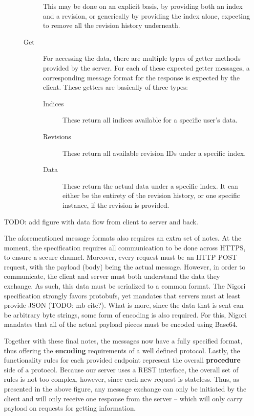 \begin{description}
\begin{description}
    This may be done on an explicit basis, by providing both an index and a revision, or generically by providing the index alone, expecting to remove all the revision history underneath.
    \item[Get] For accessing the data, there are multiple types of getter methods provided by the server.
    For each of these expected getter messages, a corresponding message format for the response is expected by the client.
    These getters are basically of three types:
    \begin{description}
      \item[Indices] These return all indices available for a specific user's data.
      \item[Revisions] These return all available revision IDs under a specific index.
      \item[Data] These return the actual data under a specific index.
      It can either be the entirety of the revision history, or one specific instance, if the revision is provided.
    \end{description}
  \end{description}
\end{description}

TODO: add figure with data flow from client to server and back.

The aforementioned message formats also requires an extra set of notes.
At the moment, the specification requires all communication to be done across HTTPS, to ensure a secure channel.
Moreover, every request must be an HTTP POST request, with the payload (body) being the actual message.
However, in order to communicate, the client and server must both understand the data they exchange.
As such, this data must be serialized to a common format.
The Nigori specification strongly favors protobufs, yet mandates that servers must at least provide JSON (TODO: mb cite?).
What is more, since the data that is sent can be arbitrary byte strings, some form of encoding is also required.
For this, Nigori mandates that all of the actual payload pieces must be encoded using Base64.

Together with these final notes, the messages now have a fully specified format, thus offering the \textbf{encoding} requirements of a well defined protocol.
Lastly, the functionality rules for each provided endpoint represent the overall \textbf{procedure} side of a protocol.
Because our server uses a REST interface, the overall set of rules is not too complex, however, since each new request is stateless.
Thus, as presented in the above figure, any message exchange can only be initiated by the client and will only receive one response from the server -- which will only carry payload on requests for getting information.

